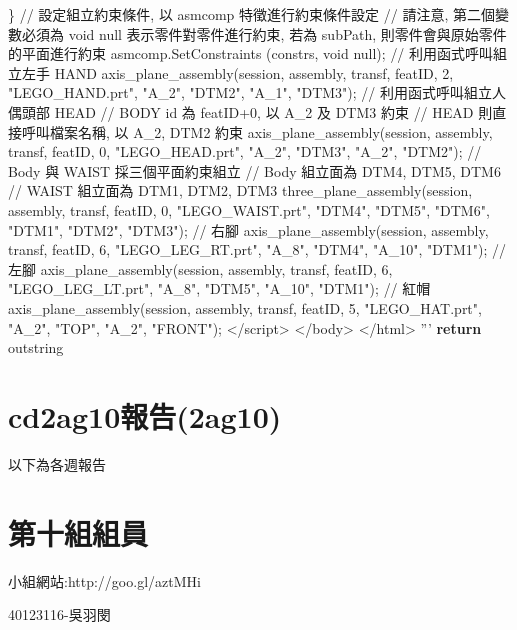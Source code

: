 \documentclass[]{article}
\newenvironment{Shaded}{}{}
\newcommand{\KeywordTok}[1]{\textcolor[rgb]{0.00,0.44,0.13}{\textbf{{#1}}}}
\newcommand{\StringTok}[1]{\textcolor[rgb]{0.25,0.44,0.63}{{#1}}}
\newcommand{\NormalTok}[1]{{#1}}
\begin{document}
\begin{Shaded}
\begin{Highlighting}[]
\StringTok{\}}
\StringTok{// 設定組立約束條件, 以 asmcomp 特徵進行約束條件設定}
\StringTok{// 請注意, 第二個變數必須為 void null 表示零件對零件進行約束, 若為 subPath, 則零件會與原始零件的平面進行約束}
\StringTok{asmcomp.SetConstraints (constrs, void null);}
\StringTok{// 利用函式呼叫組立左手 HAND}
\StringTok{axis_plane_assembly(session, assembly, transf, featID, 2, }
\StringTok{                              "LEGO_HAND.prt", "A_2", "DTM2", "A_1", "DTM3");}
\StringTok{// 利用函式呼叫組立人偶頭部 HEAD}
\StringTok{// BODY id 為 featID+0, 以 A_2 及  DTM3 約束}
\StringTok{// HEAD 則直接呼叫檔案名稱, 以 A_2, DTM2 約束}
\StringTok{axis_plane_assembly(session, assembly, transf, featID, 0, }
\StringTok{                              "LEGO_HEAD.prt", "A_2", "DTM3", "A_2", "DTM2");}
\StringTok{// Body 與 WAIST 採三個平面約束組立}
\StringTok{// Body 組立面為 DTM4, DTM5, DTM6}
\StringTok{// WAIST 組立面為 DTM1, DTM2, DTM3}
\StringTok{three_plane_assembly(session, assembly, transf, featID, 0, "LEGO_WAIST.prt", "DTM4", "DTM5", "DTM6", "DTM1", "DTM2", "DTM3"); }
\StringTok{// 右腳}
\StringTok{axis_plane_assembly(session, assembly, transf, featID, 6, }
\StringTok{                              "LEGO_LEG_RT.prt", "A_8", "DTM4", "A_10", "DTM1");}
\StringTok{// 左腳}
\StringTok{axis_plane_assembly(session, assembly, transf, featID, 6, }
\StringTok{                              "LEGO_LEG_LT.prt", "A_8", "DTM5", "A_10", "DTM1");}
\StringTok{// 紅帽}
\StringTok{axis_plane_assembly(session, assembly, transf, featID, 5, }
\StringTok{                              "LEGO_HAT.prt", "A_2", "TOP", "A_2", "FRONT");     }
\StringTok{</script>}
\StringTok{</body>}
\StringTok{</html>}
\StringTok{'''}
        \KeywordTok{return} \NormalTok{outstring}
\end{Highlighting}
\end{Shaded}

\section{cd2ag10報告(2ag10)}\label{cd2ag10ux5831ux544a2ag10}

以下為各週報告

\section{第十組組員}\label{ux7b2cux5341ux7d44ux7d44ux54e1}

小組網站:http://goo.gl/aztMHi

40123116-吳羽閔
\end{document}
